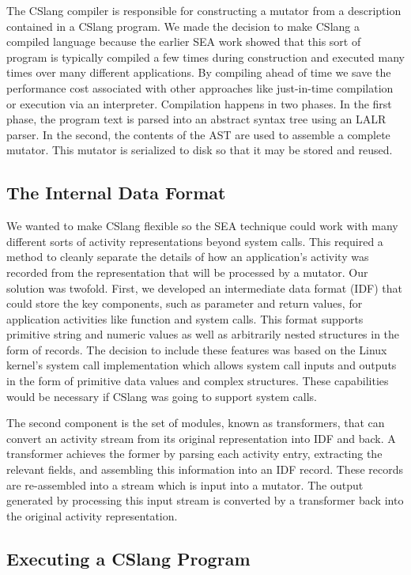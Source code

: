 The CSlang compiler is responsible for constructing a mutator
from a description contained in  a CSlang program.
We made the decision to make CSlang a compiled language because
the earlier SEA work showed that this sort of program is typically
compiled a few times during construction
and executed many times over many different applications.
By compiling ahead of time we save the performance cost associated with other
approaches like just-in-time compilation or execution via an interpreter.
Compilation happens in two phases.  In the first phase, the program text is
parsed into an abstract syntax tree using an LALR parser.
In the second, the
contents of the AST are used to assemble a complete mutator.
This mutator is serialized to
disk so that it may be stored and reused.


\subsection{The Internal Data Format}

We wanted to make CSlang flexible
so the SEA technique
could
work with many different sorts of
activity representations beyond system calls.
This required a method to cleanly separate the details of how
an application's activity was recorded from the representation that will be
processed by a mutator.
Our solution was twofold.  First, we developed an intermediate data format
(IDF) that
could store the key components, such as parameter and return values,
for application activities like function
and system calls.  This format supports primitive string and numeric
values as well as arbitrarily nested structures in the form of records.
The decision to include these features
was based on the Linux kernel's system call implementation
which allows system call inputs and outputs in the form of primitive data
values and complex structures.
These capabilities would be necessary
if CSlang was going to support system calls.

The second component is the set of modules, known as transformers, that can
convert an activity stream from its original representation into IDF and
back.  A transformer achieves the former by parsing each activity entry,
extracting the relevant fields, and assembling this information into an IDF
record.  These records are re-assembled into a stream which is input into a
mutator.
The output generated by processing this input stream
is converted by a transformer
back into the original activity representation.

\subsection{Executing a CSlang Program}

